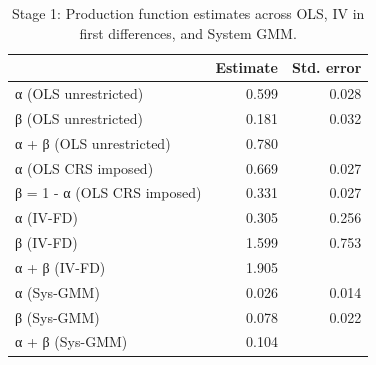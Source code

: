 \begin{table}[t]
\centering\small
\begin{tabular}{lrr}
\toprule
 & Estimate & Std. error \\
\midrule
α (OLS unrestricted) & 0.599 & 0.028 \\
β (OLS unrestricted) & 0.181 & 0.032 \\
α + β (OLS unrestricted) & 0.780 &  \\
α (OLS CRS imposed) & 0.669 & 0.027 \\
β = 1 - α (OLS CRS imposed) & 0.331 & 0.027 \\
α (IV-FD) & 0.305 & 0.256 \\
β (IV-FD) & 1.599 & 0.753 \\
α + β (IV-FD) & 1.905 &  \\
α (Sys-GMM) & 0.026 & 0.014 \\
β (Sys-GMM) & 0.078 & 0.022 \\
α + β (Sys-GMM) & 0.104 &  \\
\bottomrule
\end{tabular}
\caption{Stage 1: Production function estimates across OLS, IV in first differences, and System GMM.}
\label{tab:pf}
\end{table}